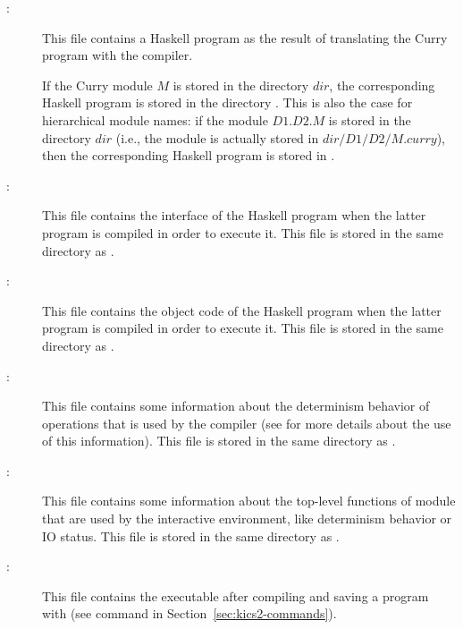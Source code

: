 \begin{description}
\item[:] This file contains a Haskell program
as the result of translating the Curry program with the
\CYS compiler.

If the Curry module $M$ is stored in the directory $dir$,
the corresponding Haskell program is stored in the directory
.
This is also the case for hierarchical module names:
if the module $D1.D2.M$ is stored in the directory $dir$
(i.e., the module is actually stored in $dir/D1/D2/M.curry$),
then the corresponding Haskell program is stored in
.

\item[:] This file contains the interface
of the Haskell program  when the latter program is
compiled in order to execute it.
This file is stored in the same directory as .

\item[:] This file contains the object code
of the Haskell program  when the latter program is
compiled in order to execute it.
This file is stored in the same directory as .

\item[:] This file contains some information about
the determinism behavior of operations that is used by the
\CYS compiler (see \cite{BrasselHanusPeemoellerReck11}
for more details about the use of this information).
This file is stored in the same directory as .

\item[:] This file contains some
information about the top-level functions of module 
that are used by the interactive environment,
like determinism behavior or IO status.
This file is stored in the same directory as .

\item[:] This file contains the executable
after compiling and saving a program with \CYS
(see command  in Section~\ref{sec:kics2-commands}).

\end{description}

